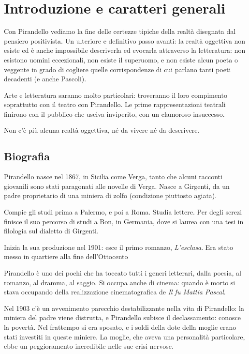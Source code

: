 \documentclass[a4paper, twoside, titlepage]{book}
\begin{document}
\chapter{Introduzione e caratteri generali}

Con Pirandello vediamo la fine delle certezze tipiche della realtà disegnata dal pensiero positivista.
Un ulteriore e definitivo passo avanti: la realtà oggettiva non esiste ed è anche impossibile descriverla ed evocarla attraverso la letteratura: non esistono uomini eccezionali, non esiste il superuomo, e non esiste alcun poeta o veggente in grado di cogliere quelle corrispondenze di cui parlano tanti poeti decadenti (e anche Pascoli).

Arte e letteratura saranno molto particolari: troveranno il loro compimento soprattutto con il teatro con Pirandello. Le prime rappresentazioni teatrali finirono con il pubblico che usciva inviperito, con un clamoroso insuccesso.

Non c'è più alcuna realtà oggettiva, né da vivere né da descrivere.

\section{Biografia}

Pirandello nasce nel 1867, in Sicilia come Verga, tanto che alcuni racconti giovanili sono stati paragonati alle novelle di Verga.
Nasce a Girgenti, da un padre proprietario di una miniera di zolfo (condizione piuttosto agiata).

Compie gli studi prima a Palermo, e poi a Roma. Studia lettere.
Per degli screzi finisce il suo percorso di studi a Bon, in Germania, dove si laurea con una tesi in filologia sul dialetto di Girgenti.

Inizia la sua produzione nel 1901: esce il primo romanzo, \textit{L'esclusa}. Era stato messo in quartiere alla fine dell'Ottocento

Pirandello è uno dei pochi che ha toccato tutti i generi letterari, dalla poesia, al romanzo, al dramma, al saggio. Si occupa anche di cinema: quando è morto si stava occupando della realizzazione cinematografica de \textit{Il fu Mattia Pascal}.

Nel 1903 c'è un avvenimento parecchio destabilizzante nella vita di Pirandello: la miniera del padre viene distrutta, e Pirandello subisce il declassamento: conosce la povertà. Nel frattempo si era sposato, e i soldi della dote della moglie erano stati investiti in queste miniere.
La moglie, che aveva una personalità particolare, ebbe un peggioramento incredibile nelle sue crisi nervose.
\end{document}

